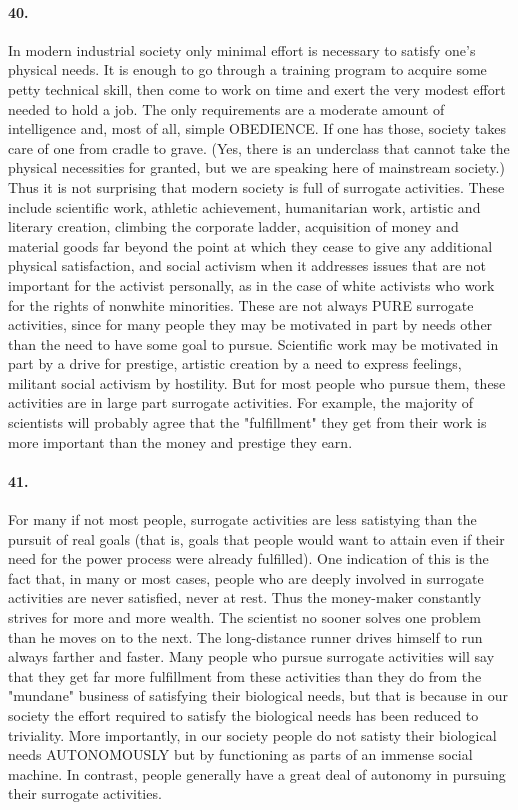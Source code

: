 \documentclass[12pt]{book}
\begin{document}
\paragraph{40.} In modern industrial society only minimal effort is necessary to satisfy one's physical needs. It is enough to go through a training program to acquire some petty technical skill, then come to work on time and exert the very modest effort needed to hold a job. The only requirements are a moderate amount of intelligence and, most of all, simple OBEDIENCE. If one has those, society takes care of one from cradle to grave. (Yes, there is an underclass that cannot take the physical necessities for granted, but we are speaking here of mainstream society.) Thus it is not surprising that modern society is full of surrogate activities. These include scientific work, athletic achievement, humanitarian work, artistic and literary creation, climbing the corporate ladder, acquisition of money and material goods far beyond the point at which they cease to give any additional physical satisfaction, and social activism when it addresses issues that are not important for the activist personally, as in the case of white activists who work for the rights of nonwhite minorities. These are not always PURE surrogate activities, since for many people they may be motivated in part by needs other than the need to have some goal to pursue. Scientific work may be motivated in part by a drive for prestige, artistic creation by a need to express feelings, militant social activism by hostility. But for most people who pursue them, these activities are in large part surrogate activities. For example, the majority of scientists will probably agree that the "fulfillment" they get from their work is more important than the money and prestige they earn.


\paragraph{41.}  For many if not most people, surrogate activities are less satistying than the pursuit of real goals (that is, goals that people would want to attain even if their need for the power process were already fulfilled). One indication of this is the fact that, in many or most cases, people who are deeply involved in surrogate activities are never satisfied, never at rest.  Thus the money-maker constantly strives for more and more wealth. The scientist no sooner solves one problem than he moves on to the next. The long-distance runner drives himself to run always farther and faster. Many people who pursue surrogate activities will say that they get far more fulfillment from these activities than they do from the "mundane" business of satisfying their biological needs, but that is because in our society the effort required to satisfy the biological needs has been reduced to triviality.  More importantly, in our society people do not satisty their biological needs AUTONOMOUSLY but by functioning as parts of an immense social machine. In contrast, people generally have a great deal of autonomy in pursuing their surrogate activities.
\end{document}
